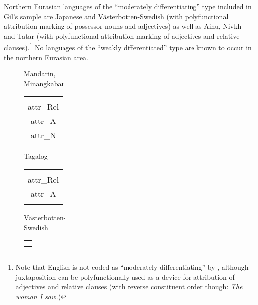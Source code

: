 Northern Eurasian languages of the “moderately differentiating” type included in Gil's sample are Japanese and Västerbotten-Swedish (with polyfunctional attribution marking of possessor nouns and adjectives) as well as Ainu, Nivkh and Tatar (with polyfunctional attribution marking of adjectives and relative clauses).\footnote{Note that English is not coded as “moderately differentiating” by \citet{gil2005}, although juxtaposition can be polyfunctionally used as a device for attribution of adjectives and relative clauses (with reverse constituent order though: {\it The woman I saw.})} No languages of the “weakly differentiated” type are known to occur in the northern Eurasian area. 

\begin{figure}[htbp] \label{multi abcd}
\begin{center}
\parbox[b]{0.20\textwidth}{
\begin{center}{\sc Mandarin},\\{\sc Minangkabau}\\
\medskip
\begin{tabular}{| c |}
\hline
\\
\hline
\hline
\\
\hline
{\sc attr}_{Rel}\\
\hline
{\sc attr}_{A}\\
\hline
{\sc attr}_{N}\\
\hline
\end{tabular}
\end{center}
}
\parbox[b]{0.20\textwidth}{
\begin{center}{\sc Tagalog}\\
\bigskip
\begin{tabular}{| c |}
\hline
\\
\hline
\hline
\\
\hline
{\sc attr}_{Rel}\\
\hline
{\sc attr}_{A}\\
\hline
\\
\hline
\end{tabular}
\end{center}
}
\parbox[b]{0.20\textwidth}{
\begin{center}{\sc Västerbotten-}\\{\sc Swedish}\\
\medskip
\begin{tabular}{| c |}
\hline
\\
\hline
\hline
\\
\hline
\\
\hline

\end{tabular}
\end{center}}
\end{center}
\end{figure}
